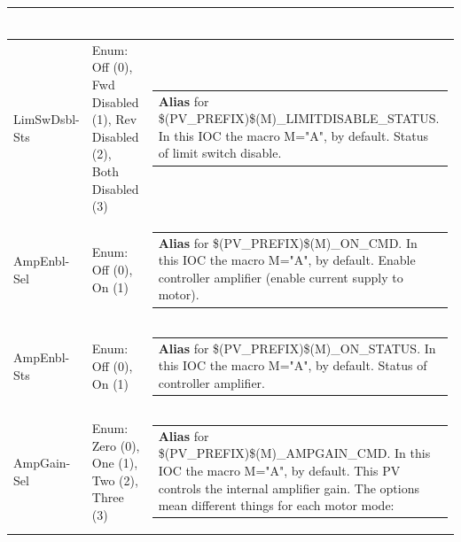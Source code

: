 \documentclass[openany]{article}
\begin{document}
\begin{longtable}{| m{4.5cm} m{2.5cm}  m{8.5cm} |}
\begin{tabular}{@{}m{6cm}@{}}
            \end{tabular} \hypertarget{}{}\\ \hline
        LimSwDsbl-Sts & Enum: Off (0), Fwd Disabled (1), Rev Disabled (2), Both Disabled (3) & \begin{tabular}{@{}m{6cm}@{}}
                \textbf{\color{blue} Alias} for \$(PV\_PREFIX)\$(M)\_LIMITDISABLE\_STATUS. In this IOC the macro M="A", by default. Status of limit switch disable.
            \end{tabular} \hypertarget{pv:amp-enbl}{}\\ \hline
        AmpEnbl-Sel & Enum: Off (0), On (1) & \begin{tabular}{@{}m{6cm}@{}}
                \textbf{\color{blue} Alias} for \$(PV\_PREFIX)\$(M)\_ON\_CMD. In this IOC the macro M="A", by default. Enable controller amplifier (enable current supply to motor).
            \end{tabular} \hypertarget{}{}\\ \hline
        AmpEnbl-Sts & Enum: Off (0), On (1) & \begin{tabular}{@{}m{6cm}@{}}
                \textbf{\color{blue} Alias} for \$(PV\_PREFIX)\$(M)\_ON\_STATUS. In this IOC the macro M="A", by default. Status of controller amplifier.
            \end{tabular} \hypertarget{pv:amp-gain}{}\\ \hline
        AmpGain-Sel & Enum: Zero (0), One (1), Two (2), Three (3) & \begin{tabular}{@{}m{6cm}@{}}
                \textbf{\color{blue} Alias} for \$(PV\_PREFIX)\$(M)\_AMPGAIN\_CMD. In this IOC the macro M="A", by default. This PV controls the internal amplifier gain. The options mean different things for each motor mode:


\end{tabular}
\end{longtable}
\end{document}
